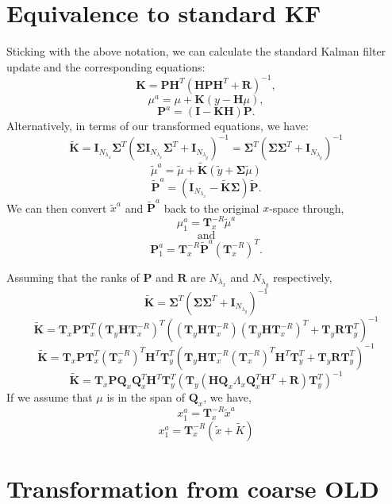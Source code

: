 \documentclass[11pt]{article} %
\newcommand{\mat}{\mathbf}
\begin{document}
\section{Equivalence to standard KF}

Sticking with the above notation, we can calculate the standard Kalman
filter update and the corresponding equations:
\[
  \mat{K} = \mat{P}\mat{H}^T (\mat{H} \mat{P} \mat{H}^T + \mat{R})^{-1},
\]
\[
  \mu^a = \mu + \mat{K} (y - \mat{H} \mu),
\]
\[
  \mat{P}^a = (\mat{I} - \mat{K} \mat{H}) \mat{P}.
\]
Alternatively, in terms of our transformed equations, we have:
\[
  \tilde{\mat{K}} = \mat{I}_{N_{\lambda_x}} \mat{\Sigma}^T ( \mat{\Sigma} \mat{I}_{N_{\lambda_x}}
  \mat{\Sigma}^T + \mat{I}_{N_{\lambda_y}})^{-1} = \mat{\Sigma}^T (\mat{\Sigma}
  \mat{\Sigma}^T + \mat{I}_{N_{\lambda_y}})^{-1}
\]
\[
  \tilde{\mu}^a = \tilde{\mu} + \tilde{\mat{K}}(\tilde{y} + \mat{\Sigma} \tilde{\mu})
\]
\[
  \tilde{\mat{P}}^a = (\mat{I}_{N_{\lambda_x}} - \tilde{\mat{K}} \mat{\Sigma}) \tilde{\mat{P}}.
\]
We can then convert $\tilde{x}^a$ and $\tilde{\mat{P}}^a$ back to the
original $x$-space through,
\[
  \mu^a_1 = \mat{T}_x^{-R} \tilde{\mu}^a
\]
\[
  \text{ and }
\]
\[
  \mat{P}^a_1 = \mat{T}_x^{-R} \tilde{\mat{P}}^a \left(\mat{T}_x^{-R}\right)^T.
\]

Assuming that the ranks of $\mat{P}$ and $\mat{R}$ are $N_{\lambda_x}$
and $N_{\lambda_y}$ respectively,
\[
  \tilde{\mat{K}} = \mat{\Sigma}^T (\mat{\Sigma} \mat{\Sigma}^T +
  \mat{I}_{N_{\lambda_y}})^{-1}
\]
\[
  \tilde{\mat{K}} = \mat{T}_x \mat{P} \mat{T}_x^T (\mat{T}_y \mat{H}
  \mat{T}_x^{-R})^T \left((\mat{T}_y \mat{H} \mat{T}_x^{-R})(\mat{T}_y
  \mat{H} \mat{T}_x^{-R})^T + \mat{T}_y \mat{R} \mat{T}_y^T \right)^{-1}
\]
\[
  \tilde{\mat{K}} = \mat{T}_x \mat{P} \mat{T}_x^T \left( \mat{T}_x^{-R}
  \right)^T \mat{H}^T \mat{T}_y^T
  \left( \mat{T}_y \mat{H} \mat{T}_x^{-R} \left( \mat{T}_x^{-R}
    \right)^T \mat{H}^T \mat{T}_y^T + \mat{T}_y \mat{R} \mat{T}_y^T \right)^{-1}
\]
\[
  \tilde{\mat{K}} = \mat{T}_x \mat{P} \mat{Q}_x \mat{Q}_x^T \mat{H}^T \mat{T}_y^T
  \left( \mat{T}_y \left( \mat{H} \mat{Q}_x \Lambda_x \mat{Q}_x^T
      \mat{H}^T + \mat{R}\right) \mat{T}_y^T \right)^{-1}
\]
If we assume that $\mu$ is in the span of $\mat{Q}_x$, we have,
\[
   x^a_1 = \mat{T}_x^{-R} \tilde{x}^a
\]
\[
   x^a_1 = \mat{T}_x^{-R} \left( \tilde{x} + \tilde{K} \right)
\]


\section{Transformation from coarse OLD}
\end{document}
